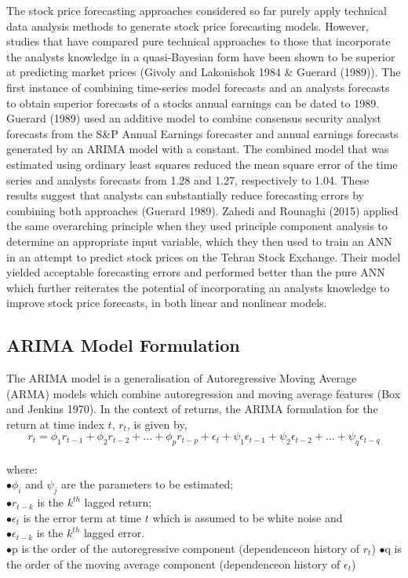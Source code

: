 \documentclass[12pt,a4paper]{article}
\numberwithin{equation}{section}
\numberwithin{figure}{section}
\numberwithin{table}{section}
\begin{document}
The stock price forecasting approaches considered so far purely apply
technical data analysis methods to generate stock price forecasting
models. However, studies that have compared pure technical approaches to
those that incorporate the analysts knowledge in a quasi-Bayesian form
have been shown to be superior at predicting market prices (Givoly and
Lakonishok 1984 \& Guerard (1989)). The first instance of combining
time-series model forecasts and an analysts forecasts to obtain superior
forecasts of a stocks annual earnings can be dated to 1989. Guerard
(1989) used an additive model to combine consensus security analyst
forecasts from the S\&P Annual Earnings forecaster and annual earnings
forecasts generated by an ARIMA model with a constant. The combined
model that was estimated using ordinary least squares reduced the mean
square error of the time series and analysts forecasts from 1.28 and
1.27, respectively to 1.04. These results suggest that analysts can
substantially reduce forecasting errors by combining both approaches
(Guerard 1989). Zahedi and Rounaghi (2015) applied the same overarching
principle when they used principle component analysis to determine an
appropriate input variable, which they then used to train an ANN in an
attempt to predict stock prices on the Tehran Stock Exchange. Their
model yielded acceptable forecasting errors and performed better than
the pure ANN which further reiterates the potential of incorporating an
analysts knowledge to improve stock price forecasts, in both linear and
nonlinear models.

\subsection{ARIMA Model Formulation}\label{arima-model-formulation}

The ARIMA model is a generalisation of Autoregressive Moving Average
(ARMA) models which combine autoregression and moving average features
(Box and Jenkins 1970). In the context of returns, the ARIMA formulation
for the return at time index \(t\), \(r_t\), is given by,
\[  r_t = \phi_1 r_{t-1} + \phi_2 r_{t-2} + ...+ \phi_p r_{t-p} + \epsilon_t +
        \psi_1 \epsilon_{t-1} + \psi_2 \epsilon_{t-2} + ... +\psi_q \epsilon_{t-q} \]\\
where:\\
\(\bullet \phi_i\) and \(\psi_j\) are the parameters to be estimated;\\
\(\bullet r_{t-k}\) is the \(k^{th}\) lagged return;\\
\(\bullet \epsilon_t\) is the error term at time \(t\) which is assumed
to be white noise and\\
\(\bullet\epsilon_{t-k}\) is the \(k^{th}\) lagged error.\\
\(\bullet\)p is the order of the autoregressive component (dependenceon
history of \(r_t\)) \(\bullet\)q is the order of the moving average
component (dependenceon history of \(\epsilon_t\))
\end{document}
